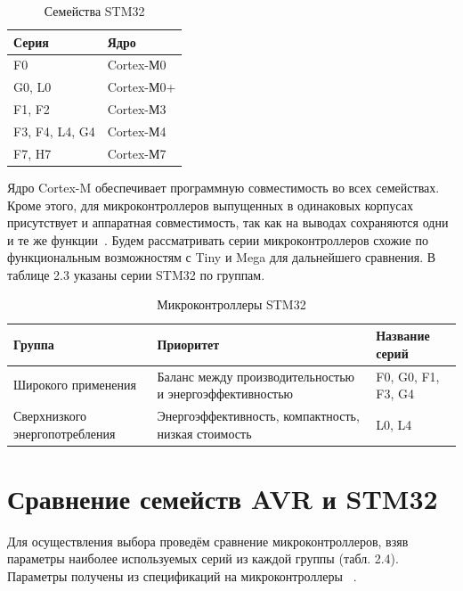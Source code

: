 \begin{table}[H]
\caption{Семейства STM32}
\begin{tabular}{|p{4 cm}|p{4 cm}|}
\hline
Серия & Ядро \\ \hline
F0  & Cortex-М0 \\ \hline
G0, L0  & Cortex-М0+ \\ \hline
F1, F2  & Cortex-М3 \\ \hline
F3, F4, L4, G4  & Cortex-М4 \\ \hline
F7, H7  & Cortex-М7 \\ \hline
\end{tabular}
\end{table}

	Ядро Cortex-M обеспечивает программную совместимость во всех семействах. Кроме этого, для микроконтроллеров выпущенных в одинаковых корпусах присутствует и аппаратная совместимость, так как на выводах сохраняются одни и те же функции~\cite{stm, avrstm}. Будем рассматривать серии микроконтроллеров схожие по функциональным возможностям с Tiny и Mega для дальнейшего сравнения. В таблице 2.3 указаны серии STM32 по группам.
	
\begin{table}[H]
\caption{Микроконтроллеры STM32}
\begin{tabular}{|p{3.25 cm}|p{8 cm}|p{4 cm}|}
\hline
Группа & Приоритет & Название серий \\ \hline
Широкого применения & Баланс между производительностью и энергоэффективностью & F0, G0, F1, F3,
G4 \\ \hline
Сверхнизкого энергопотребления & Энергоэффективность, компактность, низкая стоимость & L0, L4 \\ \hline
\end{tabular}
\end{table}

\section{Сравнение семейств AVR и STM32}
	
	Для осуществления выбора проведём сравнение микроконтроллеров, взяв параметры наиболее используемых серий из каждой группы (табл. 2.4). Параметры получены из спецификаций на микроконтроллеры ~\cite{f103,l1010f4,atmega32,attiny10}.
	
